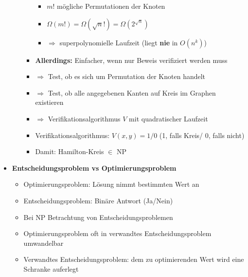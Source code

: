 \begin{itemize}
\begin{itemize}
\begin{itemize}
\begin{itemize}
                                \item $m!$ mögliche Permutationen der Knoten
                                \item $\Omega(m!) = \Omega(\sqrt{n}!) = \Omega(2^{\sqrt{n}})$
                                \item $\Rightarrow$ superpolynomielle Laufzeit (liegt \textbf{nie} in $O(n^k)$)
                            \end{itemize}
                        \item \textbf{Allerdings:} Einfacher, wenn nur Beweis verifiziert werden muss
                        \item[] $\Rightarrow$ Test, ob es sich um Permutation der Knoten handelt
                        \item[] $\Rightarrow$ Test, ob alle angegebenen Kanten auf Kreis im Graphen existieren
                        \item[] $\Rightarrow$ Verifikationsalgorithmus $V$ mit quadratischer Laufzeit   
                        \item Verifikationsalgorithmus: $V(x,y) = 1/0$ (1, falls Kreis/ 0, falls nicht) 
                        \item Damit: Hamilton-Kreis $\in$ NP
                    \end{itemize}
                \end{itemize}

\pagebreak

            \item \textbf{Entscheidungsproblem vs Optimierungsproblem}
                \begin{itemize}
                    \item Optimierungsproblem: Lösung nimmt bestimmten Wert an
                    \item Entscheidungsproblem: Binäre Antwort (Ja/Nein)
                    \item Bei NP Betrachtung von Entscheidungsproblemen
                    \item Optimierungsproblem oft in verwandtes Entscheidungsproblem umwandelbar
                    \item Verwandtes Entscheidungsproblem: dem zu optimierenden Wert wird eine Schranke auferlegt
                \end{itemize}


\end{itemize}
